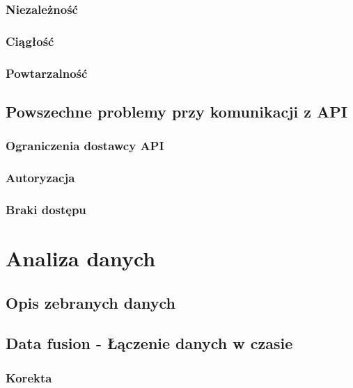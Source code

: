 \documentclass[brudnopis]{xmgr}
\begin{document}
    \subsection{Niezależność}

        \subsection{Ciągłość}

        \subsection{Powtarzalność}

    \section{Powszechne problemy przy komunikacji z API}

        \subsection{Ograniczenia dostawcy API}

        \subsection{Autoryzacja}

        \subsection{Braki dostępu}

\chapter{Analiza danych}

    \section{Opis zebranych danych}

    \section{Data fusion - Łączenie danych w czasie}

        \subsection{Korekta}
\end{document}
